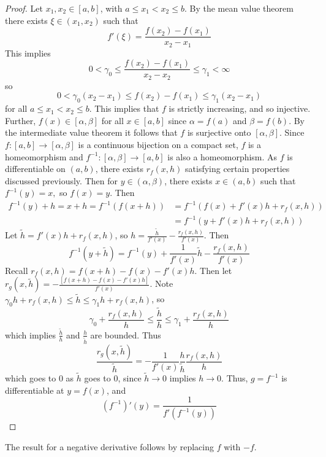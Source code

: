 \begin{proof}
    Let $x_1,x_2 \in [a,b]$, with $a \leq x_1 < x_2 \leq b$. By the mean value theorem there exists $\xi \in (x_1,x_2)$ such that $$f'(\xi) = \frac{f(x_2) - f(x_1)}{x_2-x_1}$$ This implies $$0 < \gamma_0 \leq \frac{f(x_2) - f(x_1)}{x_2-x_2} \leq \gamma_1 < \infty$$ so $$0<\gamma_0(x_2-x_1) \leq f(x_2) - f(x_1) \leq \gamma_1(x_2-x_1)$$ for all $a \leq x_1 < x_2 \leq b$. This implies that $f$ is strictly increasing, and so injective. Further, $f(x) \in [\alpha,\beta]$ for all $x \in [a,b]$ since $\alpha = f(a)$ and $\beta = f(b)$. By the intermediate value theorem it follows that $f$ is surjective onto $[\alpha,\beta]$. Since $f:[a,b]\rightarrow [\alpha,\beta]$ is a continuous bijection on a compact set, $f$ is a homeomorphism and $f^{-1}:[\alpha,\beta]\rightarrow [a,b]$ is also a homeomorphism. As $f$ is differentiable on $(a,b)$, there exists $r_f(x,h)$ satisfying certain properties discussed previously. Then for $y \in (\alpha,\beta)$, there exists $x \in (a,b)$ such that $f^{-1}(y) = x,$ so $f(x) = y$. Then \begin{align*}
        f^{-1}(y) + h = x+h = f^{-1}(f(x+h)) &= f^{-1}(f(x)+f'(x)h+r_f(x,h)) \\
        &= f^{-1}(y+f'(x)h+r_f(x,h))
    \end{align*}
    Let $\tilde{h} = f'(x)h+r_f(x,h)$, so $h = \frac{\tilde{h}}{f'(x)} - \frac{r_f(x,h)}{f'(x)}$. Then \begin{equation*}
        f^{-1}(y+\tilde{h}) = f^{-1}(y) + \frac{1}{f'(x)}\tilde{h} - \frac{r_f(x,h)}{f'(x)}
    \end{equation*}
    Recall $r_f(x,h) = f(x+h) - f(x) - f'(x)h$. Then let $r_g(x,\tilde{h}) = -\frac{[f(x+h) - f(x) - f'(x)h]}{f'(x)}$. Note $\gamma_0h + r_f(x,h) \leq \tilde{h} \leq \gamma_1 h + r_f(x,h)$, so $$\gamma_0+\frac{r_f(x,h)}{h} \leq \frac{\tilde{h}}{h} \leq \gamma_1 + \frac{r_f(x,h)}{h}$$ which implies $\frac{\tilde{h}}{h}$ and $\frac{h}{\tilde{h}}$ are bounded. Thus $$\frac{r_g(x,\tilde{h})}{\tilde{h}} = -\frac{1}{f'(x)}\frac{h}{\tilde{h}}\frac{r_f(x,h)}{h}$$ which goes to $0$ as $\tilde{h}$ goes to $0$, since $\tilde{h}\rightarrow 0$ implies $h\rightarrow 0$. Thus, $g=f^{-1}$ is differentiable at $y = f(x)$, and \begin{equation*}
        (f^{-1})'(y) = \frac{1}{f'(f^{-1}(y))}
    \end{equation*}
\end{proof}

The result for a negative derivative follows by replacing $f$ with $-f$.

